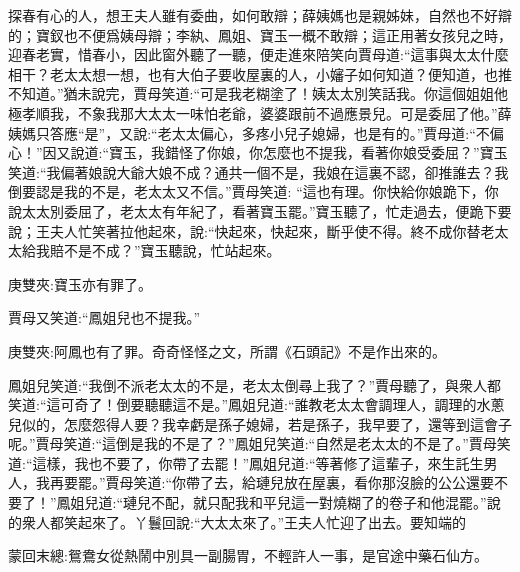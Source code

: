 \begin{parag}
    探春有心的人，想王夫人雖有委曲，如何敢辯；薛姨媽也是親姊妹，自然也不好辯的；寶釵也不便爲姨母辯；李紈、鳳姐、寶玉一概不敢辯；這正用著女孩兒之時，迎春老實，惜春小，因此窗外聽了一聽，便走進來陪笑向賈母道:“這事與太太什麼相干？老太太想一想，也有大伯子要收屋裏的人，小嬸子如何知道？便知道，也推不知道。”猶未說完，賈母笑道:“可是我老糊塗了！姨太太別笑話我。你這個姐姐他極孝順我，不象我那大太太一味怕老爺，婆婆跟前不過應景兒。可是委屈了他。”薛姨媽只答應“是”，又說:“老太太偏心，多疼小兒子媳婦，也是有的。”賈母道:“不偏心！”因又說道:“寶玉，我錯怪了你娘，你怎麼也不提我，看著你娘受委屈？”寶玉笑道:“我偏著娘說大爺大娘不成？通共一個不是，我娘在這裏不認，卻推誰去？我倒要認是我的不是，老太太又不信。”賈母笑道: “這也有理。你快給你娘跪下，你說太太別委屈了，老太太有年紀了，看著寶玉罷。”寶玉聽了，忙走過去，便跪下要說；王夫人忙笑著拉他起來，說:“快起來，快起來，斷乎使不得。終不成你替老太太給我賠不是不成？”寶玉聽說，忙站起來。\begin{note}庚雙夾:寶玉亦有罪了。\end{note}賈母又笑道:“鳳姐兒也不提我。”\begin{note}庚雙夾:阿鳳也有了罪。奇奇怪怪之文，所謂《石頭記》不是作出來的。\end{note}鳳姐兒笑道:“我倒不派老太太的不是，老太太倒尋上我了？”賈母聽了，與衆人都笑道:“這可奇了！倒要聽聽這不是。”鳳姐兒道:“誰教老太太會調理人，調理的水蔥兒似的，怎麼怨得人要？我幸虧是孫子媳婦，若是孫子，我早要了，還等到這會子呢。”賈母笑道:“這倒是我的不是了？”鳳姐兒笑道:“自然是老太太的不是了。”賈母笑道:“這樣，我也不要了，你帶了去罷！”鳳姐兒道:“等著修了這輩子，來生託生男人，我再要罷。”賈母笑道:“你帶了去，給璉兒放在屋裏，看你那沒臉的公公還要不要了！”鳳姐兒道:“璉兒不配，就只配我和平兒這一對燒糊了的卷子和他混罷。”說的衆人都笑起來了。丫鬟回說:“大太太來了。”王夫人忙迎了出去。要知端的
\end{parag}


\begin{parag}
    \begin{note}蒙回末總:鴛鴦女從熱鬧中別具一副腸胃，不輕許人一事，是官途中藥石仙方。\end{note}
\end{parag}

